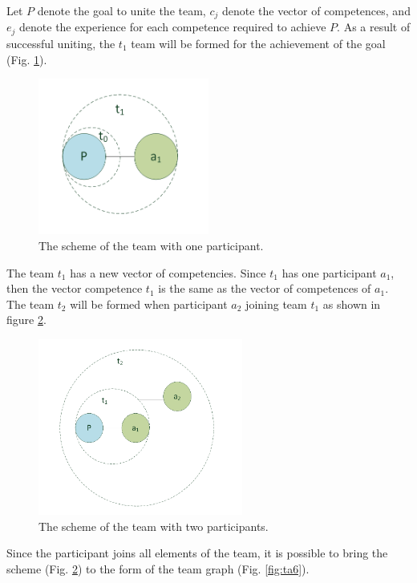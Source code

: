 \documentclass[12pt]{report}
\theoremstyle{definition}
\begin{document}
Let $P$ denote the goal to unite the team, $c_j$ denote the vector of competences, and $e_j$ denote the experience for each competence required to achieve $P$. 
As a result of successful uniting, the $t_1$ team will be formed for the achievement of the goal (Fig. \ref{fig:ta4}).

\begin{figure}[ht]
	\centering
	\includegraphics[width=0.5\textwidth]{scrum_fig4}
	\caption{The scheme of the team with one participant.}
	\label{fig:ta4}
\end{figure} 

The team $t_1$  has a new vector of competencies. 
Since $t_1$  has one participant $a_1$, then the vector competence $t_1$ is the same as the vector of competences of $a_1$. 
The team $t_2$ will be formed when participant $a_2$ joining team $t_1$  as shown in figure  \ref{fig:ta5}.

\begin{figure}[ht]
	\centering
	\includegraphics[width=0.6\textwidth]{scrum_fig5}
	\caption{The scheme of the team with two participants.}
	\label{fig:ta5}
\end{figure} 

Since the participant joins all elements of the team, it is possible to bring the scheme (Fig. \ref{fig:ta5}) to the form of the team graph (Fig. \ref{fig:ta6}).
\end{document}
